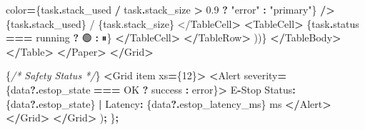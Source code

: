 \documentclass[
]{article}
\newenvironment{Shaded}{\begin{snugshade}}{\end{snugshade}}
\newcommand{\AttributeTok}[1]{\textcolor[rgb]{0.13,0.29,0.53}{#1}}
\newcommand{\CommentTok}[1]{\textcolor[rgb]{0.56,0.35,0.01}{\textit{#1}}}
\newcommand{\ConstantTok}[1]{\textcolor[rgb]{0.56,0.35,0.01}{#1}}
\newcommand{\DecValTok}[1]{\textcolor[rgb]{0.00,0.00,0.81}{#1}}
\newcommand{\FloatTok}[1]{\textcolor[rgb]{0.00,0.00,0.81}{#1}}
\newcommand{\NormalTok}[1]{#1}
\newcommand{\OperatorTok}[1]{\textcolor[rgb]{0.81,0.36,0.00}{\textbf{#1}}}
\newcommand{\SpecialStringTok}[1]{\textcolor[rgb]{0.31,0.60,0.02}{#1}}
\newcommand{\StringTok}[1]{\textcolor[rgb]{0.31,0.60,0.02}{#1}}
\begin{document}
\begin{Shaded}
\begin{Highlighting}[]
\NormalTok{                      color}\OperatorTok{=}\NormalTok{\{task}\OperatorTok{.}\AttributeTok{stack\_used} \OperatorTok{/}\NormalTok{ task}\OperatorTok{.}\AttributeTok{stack\_size} \OperatorTok{\textgreater{}} \FloatTok{0.9} \OperatorTok{?} \StringTok{"error"} \OperatorTok{:} \StringTok{"primary"}\NormalTok{\}}
                    \OperatorTok{/\textgreater{}}
\NormalTok{                    \{task}\OperatorTok{.}\AttributeTok{stack\_used}\NormalTok{\} }\SpecialStringTok{/ \{task.stack\_size\}}
\SpecialStringTok{                  \textless{}/TableCell}\OperatorTok{\textgreater{}}
                  \OperatorTok{\textless{}}\NormalTok{TableCell}\OperatorTok{\textgreater{}}
\NormalTok{                    \{task}\OperatorTok{.}\AttributeTok{status} \OperatorTok{===} \StringTok{\textquotesingle{}running\textquotesingle{}} \OperatorTok{?} \StringTok{\textquotesingle{}🟢\textquotesingle{}} \OperatorTok{:} \StringTok{\textquotesingle{}⏸\textquotesingle{}}\NormalTok{\}}
                  \OperatorTok{\textless{}/}\NormalTok{TableCell}\OperatorTok{\textgreater{}}
                \OperatorTok{\textless{}/}\NormalTok{TableRow}\OperatorTok{\textgreater{}}
\NormalTok{              ))\}}
            \OperatorTok{\textless{}/}\NormalTok{TableBody}\OperatorTok{\textgreater{}}
          \OperatorTok{\textless{}/}\NormalTok{Table}\OperatorTok{\textgreater{}}
        \OperatorTok{\textless{}/}\NormalTok{Paper}\OperatorTok{\textgreater{}}
      \OperatorTok{\textless{}/}\NormalTok{Grid}\OperatorTok{\textgreater{}}

\NormalTok{      \{}\CommentTok{/* Safety Status */}\NormalTok{\}}
      \OperatorTok{\textless{}}\NormalTok{Grid item xs}\OperatorTok{=}\NormalTok{\{}\DecValTok{12}\NormalTok{\}}\OperatorTok{\textgreater{}}
        \OperatorTok{\textless{}}\NormalTok{Alert severity}\OperatorTok{=}\NormalTok{\{data}\OperatorTok{?.}\AttributeTok{estop\_state} \OperatorTok{===} \StringTok{\textquotesingle{}OK\textquotesingle{}} \OperatorTok{?} \StringTok{\textquotesingle{}success\textquotesingle{}} \OperatorTok{:} \StringTok{\textquotesingle{}error\textquotesingle{}}\NormalTok{\}}\OperatorTok{\textgreater{}}
          \ConstantTok{E}\OperatorTok{{-}}\NormalTok{Stop Status}\OperatorTok{:}\NormalTok{ \{data}\OperatorTok{?.}\AttributeTok{estop\_state}\NormalTok{\} }\OperatorTok{|}\NormalTok{ Latency}\OperatorTok{:}\NormalTok{ \{data}\OperatorTok{?.}\AttributeTok{estop\_latency\_ms}\NormalTok{\} ms}
        \OperatorTok{\textless{}/}\NormalTok{Alert}\OperatorTok{\textgreater{}}
      \OperatorTok{\textless{}/}\NormalTok{Grid}\OperatorTok{\textgreater{}}
    \OperatorTok{\textless{}/}\NormalTok{Grid}\OperatorTok{\textgreater{}}
\NormalTok{  )}\OperatorTok{;}
\NormalTok{\}}\OperatorTok{;}
\end{Highlighting}
\end{Shaded}
\end{document}
